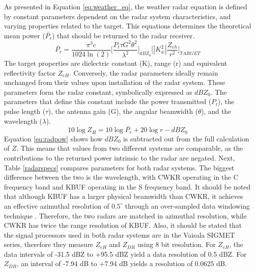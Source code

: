 As presented in Equation \ref{eq:weather_eq}, the weather radar equation is defined by constant parameters dependent on the radar system characteristics, and
varying properties related to the target. This equations determines the theoretical mean power ($\bar{P_r}$) that should be returned to the radar receiver.
\begin{equation}\label{eq:weather_eq}
\bar{P_r} = \frac{\pi^3c}{1024 \ln(2)} \Bigg[\frac{P_t \tau G^2 \theta^2}{\lambda^2}\Bigg]_{dBZ_0} \Bigg[|K_{w}^2|\frac{Z_{eh}}{r^2}\Bigg]_{TARGET}
\end{equation}
The target properties are dielectric constant (K), range (r) and equivalent reflectivity factor $Z_{eH}$. Conversely, the radar parameters ideally remain
unchanged from their values upon installation of the radar system. These parameters form the radar constant, symbolically expressed as $dBZ_0$. The
parameters that define this constant include the power transmitted ($P_t$), the pulse length ($\tau$), the antenna gain (G), the angular beamwidth
($\theta$), and the wavelength ($\lambda$).
\begin{equation}\label{eq:radpow}
10 \log Z_{H} = 10 \log{\bar{P_r}} + 20 \log r - dBZ_0
\end{equation}
Equation \ref{eq:radpow} shows how $dBZ_0$ is subtracted out from the full calculation of $Z$. This means that values from two different systems are comparable, as the contributions to the returned power intrinsic to the radar are negated. Next, Table \ref{radarspecs} compares parameters for both
radar systems. The biggest difference between the two is the wavelength, with CWKR operating in the C frequency band and KBUF operating in the S frequency
band. It should be noted that although KBUF has a larger physical beamwidth than CWKR, it achieves an effective azimuthal resolution of $0.5^{\circ}$ through
an over-sampled data windowing technique \citep{Torres2007}. Therefore, the two radars are matched in azimuthal resolution, while CWKR has twice the range
resolution of KBUF. Also, it should be stated that the signal processors used in both radar systems are in the
Vaisala SIGMET series, therefore they measure
$Z_{eH}$ and $Z_{DR}$ using 8 bit resolution. For $Z_{eH}$, the data intervals of -31.5 dBZ to +95.5 dBZ yield a
data resolution of 0.5 dBZ.  For $Z_{DR}$, an interval of -7.94 dB to +7.94 dB yields a resolution of 0.0625 dB.

